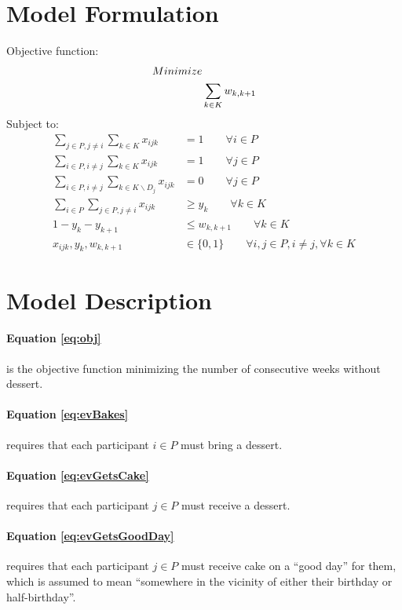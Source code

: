 \documentclass[11pt,letterpaper]{article}
\begin{document}
\section*{Model Formulation}
\noindent Objective function:
\begin{align}
Minimize & \notag \\
& \sum_{k \in K} w_{k,k+1}
\label{eq:obj}
\end{align}
Subject to:
\begin{align}
\sum_{j \in P, j \neq i} \sum_{k \in K} x_{ijk} &= 1 \qquad \forall i \in P
\label{eq:evBakes} \\
\sum_{i \in P, i \neq j} \sum_{k \in K} x_{ijk} &= 1 \qquad \forall j \in P
\label{eq:evGetsCake} \\
\sum_{i \in P, i \neq j} \sum_{k \in K \backslash D_j} x_{ijk} &= 0 \qquad \forall j \in P
\label{eq:evGetsGoodDay} \\
\sum_{i \in P} \sum_{j \in P, j \neq i} x_{ijk} &\ge y_k \qquad \forall k \in K
\label{eq:yTrig} \\
1 - y_k - y_{k+1} & \le w_{k,k+1} \qquad \forall k \in K
\label{eq:wTrig} \\
x_{ijk}, y_k, w_{k,k+1} &\in \{0,1\} \qquad \forall i,j \in P, i \neq j, \forall k \in K
\label{eq:binary}
\end{align}

\section*{Model Description}
\paragraph{Equation \eqref{eq:obj}} is the objective function minimizing the number of consecutive weeks without dessert.

\paragraph{Equation \eqref{eq:evBakes}} requires that each participant $i \in P$ must bring a dessert.

\paragraph{Equation \eqref{eq:evGetsCake}} requires that each participant $j \in P$ must receive a dessert.

\paragraph{Equation \eqref{eq:evGetsGoodDay}} requires that each participant $j \in P$ must receive cake on a ``good day'' for them, which is assumed to mean ``somewhere in the vicinity of either their birthday or half-birthday''.
\end{document}
